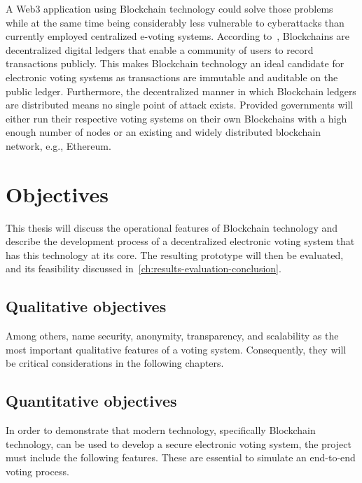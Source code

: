 A \Gls{Web3} application using \gls{Blockchain} technology could solve those problems while at the same time being considerably less vulnerable to cyberattacks than currently employed centralized e-voting systems.
According to~\textcite{yaga_blockchain_2018}, \glspl{Blockchain} are decentralized digital ledgers that enable a community of users to record transactions publicly.
This makes \gls{Blockchain} technology an ideal candidate for electronic voting systems as transactions are immutable and auditable on the public ledger.
Furthermore, the decentralized manner in which \gls{Blockchain} ledgers are distributed means no single point of attack exists.
Provided governments will either run their respective voting systems on their own \glspl{Blockchain} with a high enough number of nodes or an existing and widely distributed blockchain network, e.g., Ethereum.

\section{Objectives}\label{sec:objectives}

This thesis will discuss the operational features of \gls{Blockchain} technology and describe the development process of a decentralized electronic voting system that has this technology at its core.
The resulting prototype will then be evaluated, and its feasibility discussed in~\cref{ch:results-evaluation-conclusion}.

\subsection{Qualitative objectives}\label{subsec:qualitative-objectives}

Among others, \textcites[9-11]{jafar_blockchain_2021}[3]{diaz-santiso_e-voting_2021}{lowry_desirable_2009}[10-12]{tas_systematic_2020} name security, anonymity, transparency, and scalability as the most important qualitative features of a voting system.
Consequently, they will be critical considerations in the following chapters.

\subsection{Quantitative objectives}\label{subsec:quantitative-objectives}

In order to demonstrate that modern technology, specifically \gls{Blockchain} technology, can be used to develop a secure electronic voting system, the project must include the following features.
These are essential to simulate an end-to-end voting process.


